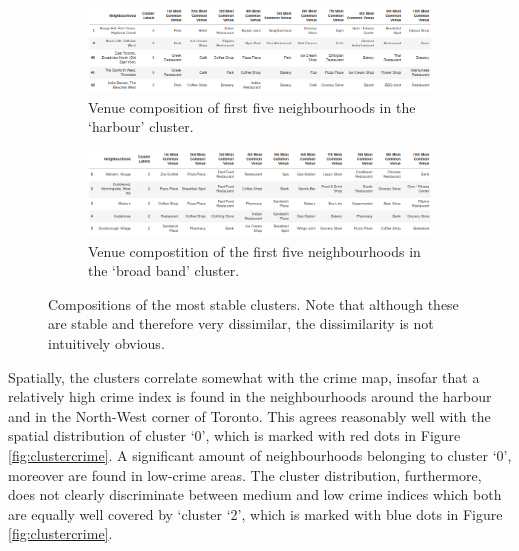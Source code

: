 \documentclass{article}
\begin{document}
\begin{figure}[ht]
     \centering
        \begin{subfigure}[b]{\textwidth}
            \centering
            \includegraphics[width=\textwidth]{pics/composition_0}
            \caption{Venue composition of first five neighbourhoods in the `harbour' cluster.}
        \end{subfigure}
        \begin{subfigure}[b]{\textwidth}
            \centering
            \includegraphics[width=\textwidth]{pics/composition_2}
            \caption{Venue compostition of the first five neighbourhoods in the `broad band' cluster.}
        \end{subfigure}
        \caption{Compositions of the most stable clusters. Note that although these are stable and therefore very dissimilar, the dissimilarity is not intuitively obvious.}
        \label{fig:composition}
\end{figure}

Spatially, the clusters correlate somewhat with the crime map, insofar that a relatively high crime index is found in the neighbourhoods around the harbour and in the North-West corner of Toronto. This agrees reasonably well with the spatial distribution of cluster `0', which is marked with red dots in Figure \ref{fig:clustercrime}. A significant amount of neighbourhoods belonging to cluster `0', moreover are found in low-crime areas. The cluster distribution, furthermore, does not clearly discriminate between medium and low crime indices which both are equally well covered by `cluster `2', which is marked with blue dots in Figure \ref{fig:clustercrime}.
\end{document}
